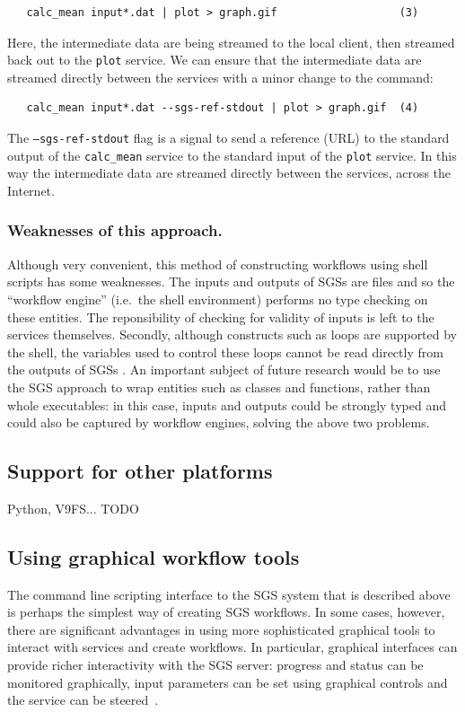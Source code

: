 \documentclass[a4paper]{article}
\begin{document}
\begin{verbatim}
   calc_mean input*.dat | plot > graph.gif                   (3)
\end{verbatim}

Here, the intermediate data are being streamed to the local client, then streamed back out to the \texttt{plot} service.  We can ensure that the intermediate data are streamed directly between the services with a minor change to the command:

\begin{verbatim}
   calc_mean input*.dat --sgs-ref-stdout | plot > graph.gif  (4)
\end{verbatim}

The \texttt{--sgs-ref-stdout} flag is a signal to send a reference (URL) to the standard output of the \texttt{calc\_mean} service to the standard input of the \texttt{plot} service.  In this way the intermediate data are streamed directly between the services, across the Internet.

\subsubsection{Weaknesses of this approach.}
Although very convenient, this method of constructing workflows using shell scripts has some weaknesses.
The inputs and outputs of SGSs are files and so the ``workflow engine'' (i.e.\ the shell environment) performs no type checking on these entities.  The reponsibility of checking for validity of inputs is left to the services themselves.  Secondly, although constructs such as loops are supported by the shell, the variables used to control these loops cannot be read directly from the outputs of SGSs%
.  An important subject of future research would be to use the SGS approach to wrap entities such as classes and functions, rather than whole executables: in this case, inputs and outputs could be strongly typed and could also be captured by workflow engines, solving the above two problems.

\subsection{Support for other platforms}
Python, V9FS... TODO

\subsection{Using graphical workflow tools}\label{subsec:graphical-workflow}
The command line scripting interface to the SGS system that is described above is perhaps the simplest way of creating SGS workflows.  In some cases, however, there are significant advantages in using more sophisticated graphical tools to interact with services and create workflows.  In particular, graphical interfaces can provide richer interactivity with the SGS server: progress and status can be monitored graphically, input parameters can be set using graphical controls
and the service can be steered~\cite{blower:2005}.
\end{document}
